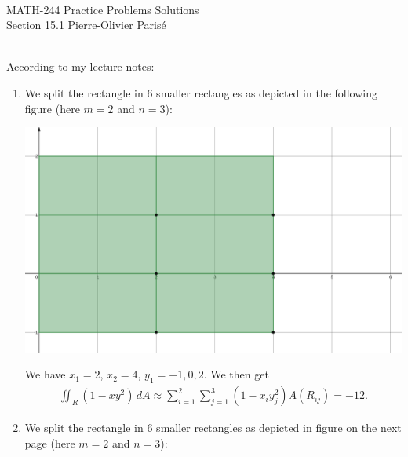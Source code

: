 


	\noindent \hrulefill \\
	MATH-244 \semester \hfill Practice Problems Solutions\\
	Section 15.1 \hfill Pierre-Olivier Paris{\'e} \\\vspace*{-1cm}
	
	\noindent\hrulefill
	
	\spc	
	
	\\
	According to my lecture notes:
	\begin{enumerate}[label=(\alph*)]
	\item We split the rectangle in 6 smaller rectangles as depicted in the following figure (here $m = 2$ and $n = 3$):
		\begin{center}
		\includegraphics[scale=0.3]{section15-1_Prob2a.png}
		\end{center}
		
		We have $x_1 = 2$, $x_2 = 4$, $y_1 = -1, 0, 2$. We then get
		\begin{align*}
		\iint_R (1 - xy^2 ) \, dA \approx \sum_{i = 1}^2 \sum_{j = 1}^3 (1 - x_i y_j^2) A(R_{ij}) = -12 .
		\end{align*}
	\item We split the rectangle in 6 smaller rectangles as depicted in figure on the next page (here $m = 2$ and $n = 3$):
		

\end{enumerate}
